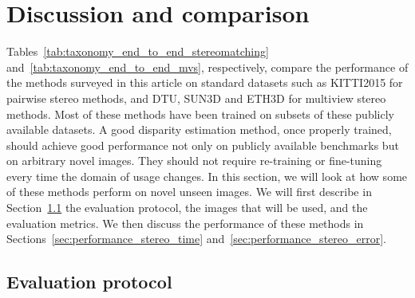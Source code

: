 \documentclass[10pt,journal,compsoc]{IEEEtran}
\begin{document}
	

\section{Discussion and comparison}
\label{sec:discussion_and_comparison}
Tables~\ref{tab:taxonomy_end_to_end_stereomatching}  and~\ref{tab:taxonomy_end_to_end_mvs}, respectively,  compare the performance of the methods surveyed in this article on standard datasets such as KITTI2015 for pairwise stereo methods,  and DTU, SUN3D and ETH3D for multiview stereo methods.  Most of these methods have been trained on subsets of these publicly available datasets.   A good disparity estimation method, once properly trained, should achieve good performance not only on publicly available benchmarks but  on arbitrary novel images. They should not require re-training or fine-tuning every time the domain of usage changes.   In this section, we will look at how some of these methods perform on novel unseen images. We will first describe in Section~\ref{sec:evaluation_protocol} the evaluation protocol,  the images that will be used, and the evaluation metrics. We then discuss the performance of these methods in Sections~\ref{sec:performance_stereo_time} and~\ref{sec:performance_stereo_error}. 




\subsection{Evaluation protocol}
\label{sec:evaluation_protocol}
\end{document}

